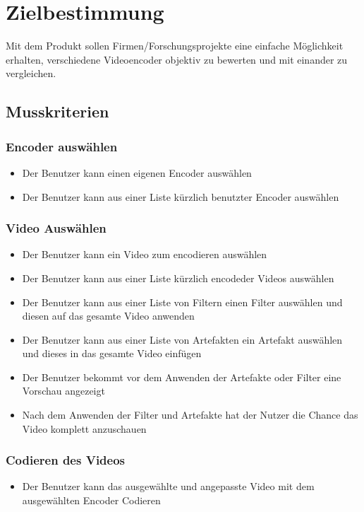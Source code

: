 \documentclass[parskip=full]{scrartcl}
\begin{document}
\maketitle
\thispagestyle{empty}
\newpage
\tableofcontents
\newpage
\section{Zielbestimmung}
Mit dem Produkt sollen Firmen/Forschungsprojekte eine einfache Möglichkeit erhalten,
verschiedene Videoencoder objektiv zu bewerten und mit einander zu vergleichen.
\subsection{Musskriterien}
\subsubsection{Encoder auswählen}
\begin{itemize}
\item Der Benutzer kann einen eigenen Encoder auswählen
\item Der Benutzer kann aus einer Liste kürzlich benutzter Encoder auswählen
\end{itemize}
\subsubsection{Video Auswählen}
\begin{itemize}
\item Der Benutzer kann ein Video zum encodieren auswählen
\item Der Benutzer kann aus einer Liste kürzlich encodeder Videos auswählen
\item Der Benutzer kann aus einer Liste von Filtern einen Filter auswählen und diesen auf
das gesamte Video anwenden
\item Der Benutzer kann aus einer Liste von Artefakten ein Artefakt auswählen und dieses
in das gesamte Video einfügen
\item Der Benutzer bekommt vor dem Anwenden der Artefakte oder Filter eine Vorschau angezeigt
\item Nach dem Anwenden der Filter und Artefakte hat der Nutzer die Chance das Video komplett
anzuschauen
\end{itemize}
\subsubsection{Codieren des Videos}
\begin{itemize}
\item Der Benutzer kann das ausgewählte und angepasste Video mit dem ausgewählten Encoder Codieren
\end{itemize}
\end{document}
